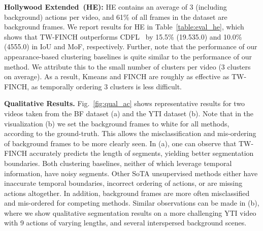 \documentclass[10pt,twocolumn,letterpaper]{article}
\begin{document}
\noindent\textbf{Hollywood Extended~(HE):} HE contains an average of 3 (including background) actions per video, and 61\% of all frames in the dataset are background frames.  
We report results for HE in Table~\ref{table:eval_he}, which shows that TW-FINCH outperforms CDFL~\cite{cdfl} by 15.5\% (19.535.0) and 10.0\% (4555.0) in IoU and MoF, respectively. Further, note that the performance of our appearance-based clustering baselines is quite similar to the performance of our method. We attribute this to the small number of clusters per video (3 clusters on average). As a result, Kmeans and FINCH are roughly as effective as TW-FINCH, as temporally ordering 3 clusters is less difficult.\\



\noindent\textbf{Qualitative Results.} Fig.~\ref{fig:qual_ac} shows representative results for two videos taken from the BF dataset (a) and the YTI dataset (b).
Note that in the visualization (b) we set the background frames to white for all methods, according to the ground-truth. This allows the misclassification and mis-ordering of background frames to be more clearly seen.
In (a), one can observe that TW-FINCH accurately predicts the length of segments, yielding better segmentation boundaries. Both clustering baselines, neither of which leverage temporal information, have noisy segments. Other SoTA unsupervised methods either have inaccurate temporal boundaries, incorrect ordering of actions, or are missing actions altogether. In addition, background frames are more often misclassified and mis-ordered for competing methods. Similar observations can be made in (b), where we show qualitative segmentation results on a more challenging YTI video with 9 actions of varying lengths, and several interspersed background scenes.\\
\end{document}
